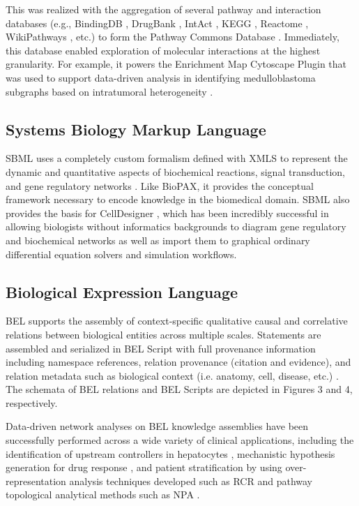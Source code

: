 This was realized with the aggregation of several pathway and interaction databases (e.g., BindingDB \cite{Gilson2016}, DrugBank \cite{Law2014}, IntAct \cite{Orchard2014}, \ac{KEGG} \cite{Kanehisa2017}, Reactome \cite{Fabregat2016}, WikiPathways \cite{Pico2008}, etc.) to form the Pathway Commons Database \cite{Cerami2011}. Immediately, this database enabled exploration of molecular interactions at the highest granularity. For example, it powers the Enrichment Map Cytoscape Plugin \cite{Merico2010} that was used to support data-driven analysis in identifying medulloblastoma subgraphs based on intratumoral heterogeneity \cite{Cavalli2017}.

\subsection{Systems Biology Markup Language}

\ac{SBML} uses a completely custom formalism defined with \ac{XMLS} to represent the dynamic and quantitative aspects of biochemical reactions, signal transduction, and gene regulatory networks \cite{Hucka2003}. Like \ac{BioPAX}, it provides the conceptual framework necessary to encode knowledge in the biomedical domain. \ac{SBML} also provides the basis for CellDesigner \cite{Funahashi2003}, which has been incredibly successful in allowing biologists without informatics backgrounds to diagram gene regulatory and biochemical networks as well as import them to graphical ordinary differential equation solvers and simulation workflows. 

\subsection{Biological Expression Language}

\ac{BEL} supports the assembly of context-specific qualitative causal and correlative relations between biological entities across multiple scales. Statements are assembled and serialized in \ac{BEL} Script with full provenance information including namespace references, relation provenance (citation and evidence), and relation metadata such as  biological context (i.e. anatomy, cell, disease, etc.) \cite{Slater2014}. The schemata of BEL relations and BEL Scripts are depicted in Figures 3 and 4, respectively.

Data-driven network analyses on \ac{BEL} knowledge assemblies have been successfully performed across a wide variety of clinical applications, including the identification of upstream controllers in hepatocytes \cite{Deehan2012}, mechanistic hypothesis generation for drug response \cite{Laifenfeld2014}, and patient stratification \cite{Laifenfeld2012} by using over-representation analysis techniques developed such as \ac{RCR} \cite{Catlett2013} and pathway topological analytical methods such as \ac{NPA} \cite{Martin2014}.


